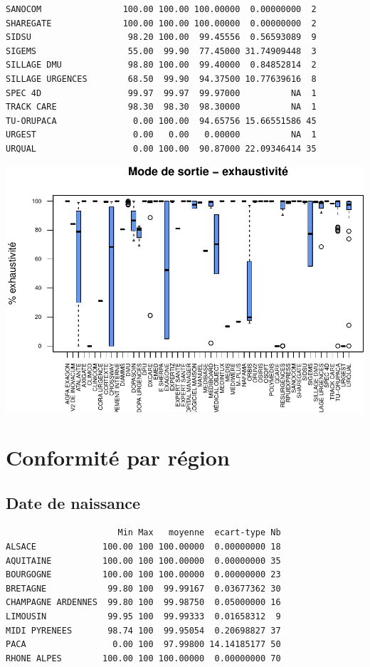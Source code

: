 \documentclass[]{article}
\begin{document}
\begin{verbatim}
SANOCOM                100.00 100.00 100.00000  0.00000000  2
SHAREGATE              100.00 100.00 100.00000  0.00000000  2
SIDSU                   98.20 100.00  99.45556  0.56593089  9
SIGEMS                  55.00  99.90  77.45000 31.74909448  3
SILLAGE DMU             98.80 100.00  99.40000  0.84852814  2
SILLAGE URGENCES        68.50  99.90  94.37500 10.77639616  8
SPEC 4D                 99.97  99.97  99.97000          NA  1
TRACK CARE              98.30  98.30  98.30000          NA  1
TU-ORUPACA               0.00 100.00  94.65756 15.66551586 45
URGEST                   0.00   0.00   0.00000          NA  1
URQUAL                   0.00 100.00  90.87000 22.09346414 35
\end{verbatim}

\includegraphics{septembre2015_files/figure-latex/unnamed-chunk-24-1.pdf}

\section{Conformité par région}\label{conformite-par-region}

\subsection{Date de naissance}\label{date-de-naissance-1}

\begin{verbatim}
                      Min Max   moyenne  ecart-type Nb
ALSACE             100.00 100 100.00000  0.00000000 18
AQUITAINE          100.00 100 100.00000  0.00000000 35
BOURGOGNE          100.00 100 100.00000  0.00000000 23
BRETAGNE            99.80 100  99.99167  0.03677362 30
CHAMPAGNE ARDENNES  99.80 100  99.98750  0.05000000 16
LIMOUSIN            99.95 100  99.99333  0.01658312  9
MIDI PYRENEES       98.74 100  99.95054  0.20698827 37
PACA                 0.00 100  97.99800 14.14185177 50
RHONE ALPES        100.00 100 100.00000  0.00000000 70
\end{verbatim}
\end{document}
